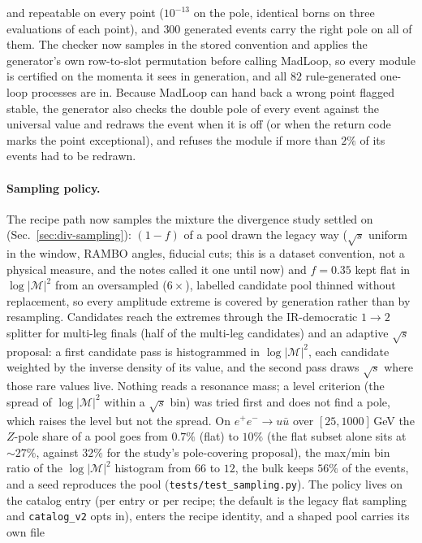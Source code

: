 \documentclass[11pt]{article}
\newcommand{\code}[1]{\texttt{#1}}
\begin{document}
and repeatable on every point ($10^{-13}$ on the pole, identical borns on three evaluations of
each point), and $300$ generated events carry the right pole on all of them. The checker now samples in
the stored convention and applies the generator's own row-to-slot permutation before calling
MadLoop, so every module is certified on the momenta it sees in generation, and all $82$
rule-generated one-loop processes are in. Because MadLoop can hand back a wrong point flagged
stable, the generator also checks the double pole of every event against the universal value
and redraws the event when it is off (or when the return code marks the point exceptional),
and refuses the module if more than $2\%$ of its events had to be redrawn.

\paragraph{Sampling policy.} The recipe path now samples the mixture the divergence study
settled on (Sec.~\ref{sec:div-sampling}): $(1-f)$ of a pool drawn the legacy way ($\sqrt s$
uniform in the window, RAMBO angles, fiducial cuts; this is a dataset convention, not a
physical measure, and the notes called it one until now) and $f=0.35$ kept flat in
$\log|\mathcal M|^2$ from an oversampled ($6\times$), labelled candidate pool thinned without
replacement, so every amplitude extreme is covered by generation rather than by resampling.
Candidates reach the extremes through the IR-democratic $1\to2$ splitter for multi-leg finals
(half of the multi-leg candidates) and an adaptive $\sqrt s$ proposal: a first candidate pass is
histogrammed in $\log|\mathcal M|^2$, each candidate weighted by the inverse density of its value,
and the second pass draws $\sqrt s$ where those rare values live. Nothing reads a resonance mass;
a level criterion (the spread of $\log|\mathcal M|^2$ within a $\sqrt s$ bin) was tried first and
does not find a pole, which raises the level but not the spread. On $e^+e^-\to u\bar u$ over
$[25,1000]$\,GeV the $Z$-pole share of a pool goes from $0.7\%$ (flat) to $10\%$ (the flat
subset alone sits at ${\sim}27\%$, against $32\%$ for the study's pole-covering proposal), the
max/min bin ratio of the $\log|\mathcal M|^2$ histogram from $66$ to $12$, the bulk keeps $56\%$
of the events, and a seed reproduces the pool (\code{tests/test\_sampling.py}). The policy lives
on the catalog entry (per entry or per recipe; the default is the legacy flat sampling and
\code{catalog\_v2} opts in), enters the recipe identity, and a shaped pool carries its own file
\end{document}
